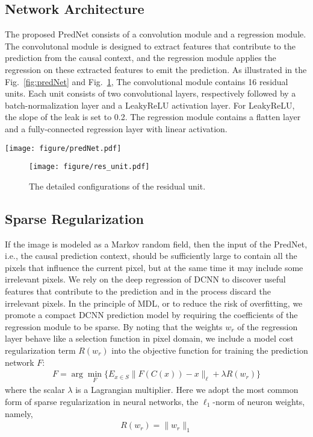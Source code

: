 \documentclass{article}
\begin{document}
\subsection{Network Architecture}
The proposed PredNet consists of a convolution module and a regression module.
The convolutonal module is designed to extract features that contribute to the prediction from the causal context, and the regression module applies the regression on these extracted features to emit the prediction.
As illustrated in the Fig.~\ref{fig:predNet} and Fig.~\ref{fig:res_unit},
The convolutional module contains 16 residual units. Each unit consists of two convolutional layers, respectively followed by a batch-normalization layer and a LeakyReLU activation layer. For LeakyReLU, the slope of the leak is set to 0.2.
The regression module contains a flatten layer and a fully-connected regression layer with linear activation.

\begin{figure*}[h]
	\centering
	\texttt{[image: figure/predNet.pdf]}
	\caption{The architecture of the deep prediction network (PredNet).}
	\label{fig:predNet}
\end{figure*}
\begin{figure}[h]
	\centering
	\texttt{[image: figure/res\_unit.pdf]}
	\caption{The detailed configurations of the residual unit.}
	\label{fig:res_unit}
\end{figure}

\subsection{Sparse Regularization}
If the image is modeled as a Markov random field, then the input of the PredNet, i.e., the causal prediction context, should be sufficiently large to contain all the pixels that influence the current pixel, but at the same time it may include some irrelevant pixels.
We rely on the deep regression of DCNN to discover useful features that contribute to the prediction and in the process discard the irrelevant pixels.  In the principle of MDL, or to reduce the risk of overfitting, we promote a compact DCNN prediction model by requiring the coefficients of the regression module to be sparse.  By noting that the weights $w_r$ of the regression layer behave like a selection function in pixel domain, we include a model cost regularization term $R(w_r)$ into the objective function for training the prediction network $F$:
\begin{align}
	F = \arg \min_F
		\bigg\{
				E_{x\in S} \| F(C(x)) - x \|_\ell
						+ \lambda R(w_{r})
		\bigg\}
\end{align}
where the scalar $\lambda$ is a Lagrangian multiplier.  Here we adopt the most common form of sparse regularization in neural networks, the $\ell_1$-norm of neuron weights, namely,
\begin{align}
	R(w_r) = \| w_r \|_1
\end{align}
\end{document}
